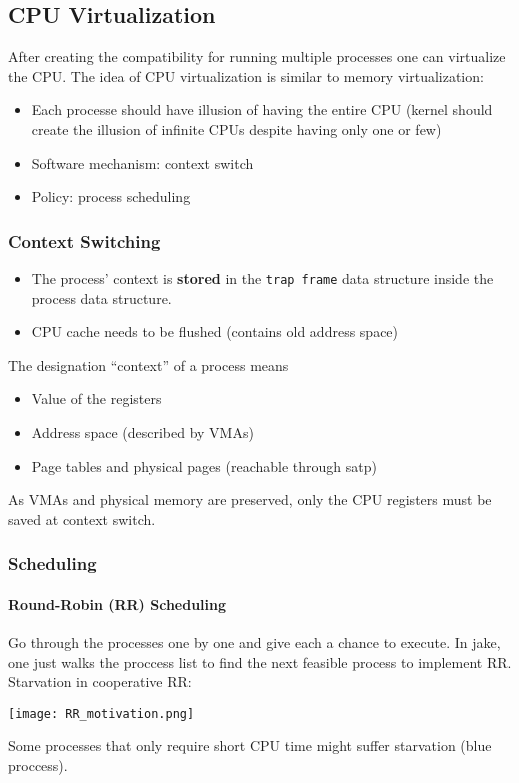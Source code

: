 \subsection{CPU Virtualization}
After creating the compatibility for running multiple processes one can virtualize the CPU. The idea of CPU virtualization is similar to memory virtualization:
\begin{itemize}
    \item Each processe should have illusion of having the entire CPU (kernel should create the illusion of infinite CPUs despite having only one or few)
    \item Software mechanism: context switch
    \item Policy: process scheduling
\end{itemize}
\subsubsection{Context Switching}
\begin{itemize}
    \item The process' context is \textbf{stored} in the \texttt{trap frame} data structure inside the process data structure.
    \item CPU cache needs to be flushed (contains old address space)
\end{itemize}


The designation ``context'' of a process means
\begin{itemize}
    \item Value of the registers
    \item Address space (described by VMAs)
    \item Page tables and physical pages (reachable through satp)
\end{itemize}
As VMAs and physical memory are preserved, only the CPU registers must be saved at context switch.

\subsubsection{Scheduling}
\paragraph{Round-Robin (RR) Scheduling}

Go through the processes one by one and give each a chance to execute. In jake, one just walks the proccess list to find the next feasible process to implement RR.\\
Starvation in cooperative RR:
\begin{center}
    \texttt{[image: RR\_motivation.png]}
\end{center}
Some processes that only require short CPU time might suffer starvation (blue proccess).

